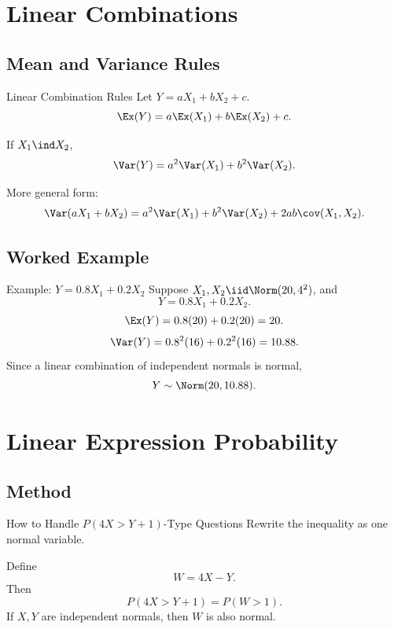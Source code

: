 \documentclass[aspectratio=169]{beamer}
\begin{document}
\section{Linear Combinations}

\subsection{Mean and Variance Rules}
\begin{frame}{Linear Combination Rules}
  Let \(Y=aX_1+bX_2+c\).
  \[
    \Ex(Y)=a\Ex(X_1)+b\Ex(X_2)+c.
  \]

  If \(X_1\ind X_2\),
  \[
    \Var(Y)=a^2\Var(X_1)+b^2\Var(X_2).
  \]

  More general form:
  \[
    \Var(aX_1+bX_2)=a^2\Var(X_1)+b^2\Var(X_2)+2ab\cov(X_1,X_2).
  \]
\end{frame}

\subsection{Worked Example}
\begin{frame}{Example: \(Y=0.8X_1+0.2X_2\)}
  Suppose \(X_1,X_2\iid\Norm(20,4^2)\), and
  \[
    Y=0.8X_1+0.2X_2.
  \]
  \[
    \Ex(Y)=0.8(20)+0.2(20)=20.
  \]
  \[
    \Var(Y)=0.8^2(16)+0.2^2(16)=10.88.
  \]
  Since a linear combination of independent normals is normal,
  \[
    Y\sim\Norm(20,10.88).
  \]
\end{frame}

\section{Linear Expression Probability}

\subsection{Method}
\begin{frame}{How to Handle \(P(4X>Y+1)\)-Type Questions}
  Rewrite the inequality as one normal variable.

  Define
  \[
    W=4X-Y.
  \]
  Then
  \[
    P(4X>Y+1)=P(W>1).
  \]
  If \(X,Y\) are independent normals, then \(W\) is also normal.
\end{frame}
\end{document}
